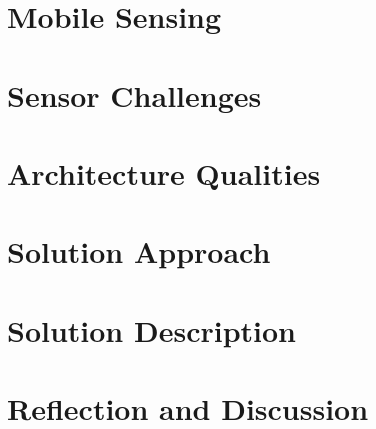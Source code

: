 \documentclass[a4paper]{article}
\theoremstyle{plain}
\begin{document}
    
    
    
    
    
    

\section{Mobile Sensing} 
    
    
\section{Sensor Challenges}
    
        

\section{Architecture Qualities}
    
    


\section{Solution Approach}
    

\section{Solution Description}
    
%     
\section{Reflection and Discussion}
    
\end{document}
